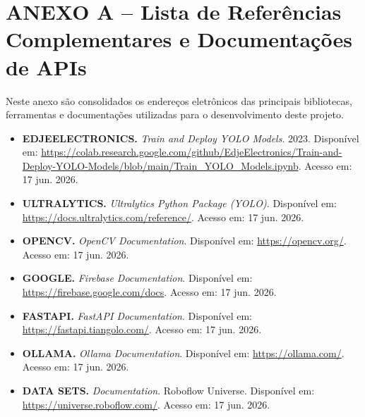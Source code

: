 \chapter*{ANEXO A -- Lista de Referências Complementares e Documentações de APIs}
\label{anexo:documentacoes}

Neste anexo são consolidados os endereços eletrônicos das principais bibliotecas, ferramentas e documentações utilizadas para o desenvolvimento deste projeto.

\begin{itemize}
    \item \textbf{EDJEELECTRONICS.} \textit{Train and Deploy YOLO Models}. 2023. Disponível em: \url{https://colab.research.google.com/github/EdjeElectronics/Train-and-Deploy-YOLO-Models/blob/main/Train_YOLO_Models.ipynb}. Acesso em: 17 jun. 2026.
    \item \textbf{ULTRALYTICS.} \textit{Ultralytics Python Package (YOLO)}. Disponível em: \url{https://docs.ultralytics.com/reference/}. Acesso em: 17 jun. 2026.
    \item \textbf{OPENCV.} \textit{OpenCV Documentation}. Disponível em: \url{https://opencv.org/}. Acesso em: 17 jun. 2026.
    \item \textbf{GOOGLE.} \textit{Firebase Documentation}. Disponível em: \url{https://firebase.google.com/docs}. Acesso em: 17 jun. 2026.
    \item \textbf{FASTAPI.} \textit{FastAPI Documentation}. Disponível em: \url{https://fastapi.tiangolo.com/}. Acesso em: 17 jun. 2026.
    \item \textbf{OLLAMA.} \textit{Ollama Documentation}. Disponível em: \url{https://ollama.com/}. Acesso em: 17 jun. 2026.
    \item \textbf{DATA SETS.} \textit{Documentation}. Roboflow Universe. Disponível em: \url{https://universe.roboflow.com/}. Acesso em: 17 jun. 2026.
\end{itemize}
